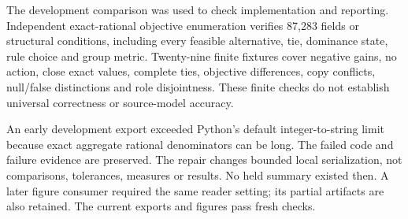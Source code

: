 \documentclass[10pt,letterpaper]{article}
\begin{document}
The development comparison was used to check implementation and reporting. Independent exact-rational objective enumeration verifies 87,283 fields or structural conditions, including every feasible alternative, tie, dominance state, rule choice and group metric. Twenty-nine finite fixtures cover negative gains, no action, close exact values, complete ties, objective differences, copy conflicts, null/false distinctions and role disjointness. These finite checks do not establish universal correctness or source-model accuracy.

An early development export exceeded Python's default integer-to-string limit because exact aggregate rational denominators can be long. The failed code and failure evidence are preserved. The repair changes bounded local serialization, not comparisons, tolerances, measures or results. No held summary existed then. A later figure consumer required the same reader setting; its partial artifacts are also retained. The current exports and figures pass fresh checks.
\newpage
\end{document}
